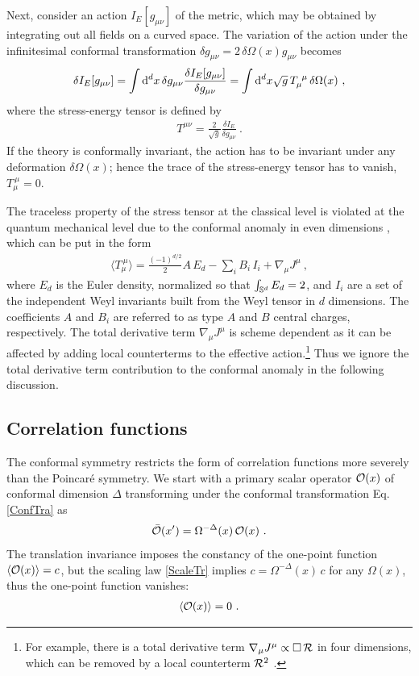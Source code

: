 Next, consider an action $I_E[g_{\mu\nu}]$ of the metric, which may be obtained by integrating out all fields on a curved space. 
The variation of the action under the infinitesimal conformal transformation $\delta g_{\mu\nu} = 2\,\delta \Omega (x) g_{\mu\nu}$ becomes
\begin{align}
\delta I_E[g_{\mu\nu}] = \int \mathrm{d}^d x\,\delta g_{\mu\nu} \frac{\delta I_E[g_{\mu\nu}]}{\delta g_{\mu\nu}} =\int \mathrm{d}^d x \sqrt{g}\, T_{\mu}^{~\mu}\, \delta \Omega(x) \ ,
\end{align}
where the stress-energy tensor is defined by
\begin{align}\label{STDef}
T^{\mu\nu} = \frac{2}{\sqrt{g}} \frac{\delta I_E}{\delta g_{\mu\nu}} \ .
\end{align}
If the theory is conformally invariant, the action has to be invariant under any deformation $\delta \Omega(x)$; hence the trace of the stress-energy tensor has to vanish, $T_\mu^{~\mu} = 0$.

The traceless property of the stress tensor at the classical level is violated at the quantum mechanical level due to the conformal anomaly in even dimensions \cite{Bonora:1985cq,Duff:1993wm,Deser:1993yx}, which can be put in the form
\begin{align}\label{WeylAnomaly}
\langle T_\mu^{~\mu} \rangle = \frac{(-1)^{d/2}}{2} A\, E_{d} - \sum_i B_i \,I_i + \nabla_\mu J^\mu\ ,
\end{align}
where $E_{d}$ is the Euler density, normalized so that $\int_{\mathbb{S}^{d}} E_{d} = 2$, and $I_i$ are a set of the independent Weyl invariants built from the Weyl tensor in $d$ dimensions.
The coefficients $A$ and $B_i$ are referred to as type $A$ and $B$ central charges, respectively.
The total derivative term $\nabla_\mu J^\mu$ is scheme dependent as it can be affected by adding local counterterms to the effective action.\footnote{For example, there is a total derivative term $\nabla_\mu J^\mu \propto \Box\, {\cal R}$ in four dimensions, which can be removed by a local counterterm ${\cal R}^2$ \cite{Birrell:1982ix}.}
Thus we ignore the total derivative term contribution to the conformal anomaly in the following discussion.


\subsection{Correlation functions}
The conformal symmetry restricts the form of correlation functions more severely than the Poincar{\'e} symmetry.
We start with a primary scalar operator ${\cal O}(x)$ of conformal dimension $\Delta$  transforming under the conformal transformation Eq.\,\eqref{ConfTra} as
\begin{align}\label{ScaleTr}
	\bar {{\cal O}} (x') = \Omega^{-\Delta}(x)\, {\cal O}(x) \ .
\end{align}
The translation invariance imposes the constancy of the one-point function $\langle {\cal O}(x)\rangle = c$, but the scaling law \eqref{ScaleTr} implies $c = \Omega^{-\Delta}(x)\, c$ for any $\Omega(x)$, thus the one-point function vanishes:
\begin{align}
	\langle {\cal O}(x)\rangle = 0 \ .
\end{align}


